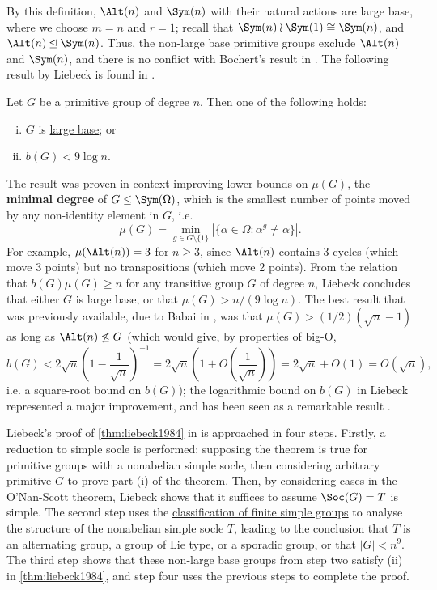 By this definition, $\Alt(n)$ and $\Sym(n)$ with their natural actions are large base, where we choose $m = n$ and $r = 1$; recall that $\Sym(n) \wr \Sym(1) \cong \Sym(n)$, and $\Alt(n) \unlhd \Sym(n)$. Thus, the non-large base primitive groups exclude $\Alt(n)$ and $\Sym(n)$, and there is no conflict with Bochert's result in \cite{bochert1889}. The following result by Liebeck is found in \cite{liebeck1984}.

\begin{theorem}[Liebeck, 1984]\label{thm:liebeck1984}
    Let $G$ be a primitive group of degree $n$. Then one of the following holds:
    \begin{enumerate}[(i)]
        \item $G$ is \hyperref[def:large_base]{large base}; or
        \item $b(G) < 9\log n$.
    \end{enumerate}
\end{theorem}

The result was proven in context improving lower bounds on $\mu(G)$, the \textbf{minimal degree} of $G \leq \Sym(\Omega)$, which is the smallest number of points moved by any non-identity element in $G$, i.e.
$$\mu(G) = \min_{g \in G \setminus \{1\}}|\{\alpha \in \Omega : \alpha^g \neq \alpha\}|.$$
For example, $\mu(\Alt(n)) = 3$ for $n \geq 3$, since $\Alt(n)$ contains 3-cycles (which move 3 points) but no transpositions (which move 2 points). From the relation that $b(G)\mu(G) \geq n$ for any transitive group $G$ of degree $n$, Liebeck concludes that either $G$ is large base, or that $\mu(G) > n/(9 \log n)$. The best result that was previously available, due to Babai in \cite{babai1981}, was that $\mu(G) > (1/2)(\sqrt{n} - 1)$ as long as $\Alt(n) \not\leq G$ (which would give, by properties of \hyperref[def:big_O_notation]{big-O},
$$b(G) < 2\sqrt{n}\left(1 - \frac{1}{\sqrt{n}}\right)^{-1} = 2\sqrt{n}\left(1 + O\left(\frac{1}{\sqrt{n}}\right)\right) = 2\sqrt{n} + O(1) = O(\sqrt{n}),$$
i.e. a square-root bound on $b(G)$); the logarithmic bound on $b(G)$ in Liebeck represented a major improvement, and has been seen as a remarkable result \cite{moscatiello_roney-dougal2021}.

Liebeck's proof of \autoref{thm:liebeck1984} in \cite{liebeck1984} is approached in four steps. Firstly, a reduction to simple socle is performed: supposing the theorem is true for primitive groups with a nonabelian simple socle, then considering arbitrary primitive $G$ to prove part (i) of the theorem. Then, by considering cases in the O'Nan-Scott theorem, Liebeck shows that it suffices to assume $\Soc(G) = T$ is simple. The second step uses the \hyperref[thm:cfsg]{classification of finite simple groups} to analyse the structure of the nonabelian simple socle $T$, leading to the conclusion that $T$ is an alternating group, a group of Lie type, or a sporadic group, or that $|G| < n^9$. The third step shows that these non-large base groups from step two satisfy (ii) in \autoref{thm:liebeck1984}, and step four uses the previous steps to complete the proof.

